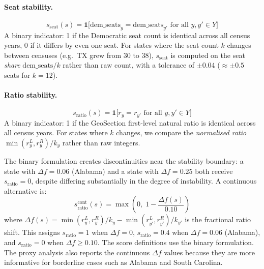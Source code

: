\paragraph{Seat stability.}
\begin{equation}
  s_{\text{seat}}(s) = \mathbf{1}\bigl[\text{dem\_seats}_y = \text{dem\_seats}_{y'}
                       \text{ for all } y, y' \in Y\bigr]
\end{equation}
A binary indicator: 1 if the Democratic seat count is identical across all
census years, 0 if it differs by even one seat.
For states where the seat count $k$ changes between censuses (e.g.\ TX grew from
30 to 38), $s_{\text{seat}}$ is computed on the seat \emph{share}
$\text{dem\_seats}/k$ rather than raw count, with a tolerance of $\pm 0.04$
($\approx \pm0.5$ seats for $k=12$).

\paragraph{Ratio stability.}
\begin{equation}
  s_{\text{ratio}}(s) = \mathbf{1}\bigl[r_y = r_{y'}
                       \text{ for all } y, y' \in Y\bigr]
\end{equation}
A binary indicator: 1 if the GeoSection first-level natural ratio is identical
across all census years.
For states where $k$ changes, we compare the \emph{normalised ratio}
$\min(r_y^L, r_y^R) / k_y$ rather than raw integers.

\begin{remark}
The binary formulation creates discontinuities near the stability boundary:
a state with $\Delta f = 0.06$ (Alabama) and a state with $\Delta f = 0.25$
both receive $s_{\text{ratio}} = 0$, despite differing substantially in the
degree of instability.
A continuous alternative is:
\[
  s^{\text{cont}}_{\text{ratio}}(s) = \max\!\left(0,\; 1 - \frac{\Delta f(s)}{0.10}\right)
\]
where $\Delta f(s) = \min(r_y^L, r_y^R)/k_y - \min(r_{y'}^L, r_{y'}^R)/k_{y'}$
is the fractional ratio shift.
This assigns $s_{\text{ratio}} = 1$ when $\Delta f = 0$, $s_{\text{ratio}} = 0.4$
when $\Delta f = 0.06$ (Alabama), and $s_{\text{ratio}} = 0$ when $\Delta f \geq 0.10$.
The score definitions use the binary formulation.  The proxy analysis also
reports the continuous $\Delta f$ values because they are more informative for
borderline cases such as Alabama and South Carolina.
\end{remark}

